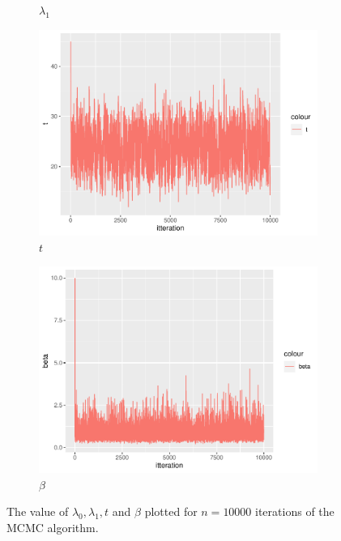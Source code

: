\begin{figure}
\begin{subfigure}[b]{0.49\textwidth}
        \caption{$\lambda_1$}
        \label{fig:burnin_lam1}
    \end{subfigure}
    \begin{subfigure}[b]{0.49\textwidth}
        \centering
        \includegraphics[width = \textwidth]{Images/sim_t.pdf}
        \caption{$t$}
        \label{fig:burnin_t}
    \end{subfigure}
    \begin{subfigure}[b]{0.49\textwidth}
        \centering
        \includegraphics[width = \textwidth]{Images/sim_beta.pdf}
        \caption{$\beta$}
        \label{fig:burnin_beta}
    \end{subfigure}
    \caption{The value of $\lambda_0, \lambda_1, t$ and $\beta$ plotted for $n = 10000$ iterations of the MCMC algorithm.}
    \label{fig:burnin_singleMH}
\end{figure}

